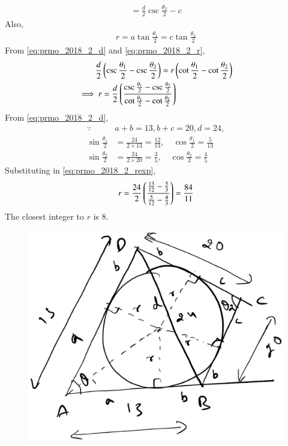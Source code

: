 \documentclass[journal,12pt,twocolumn]{IEEEtran}
\renewcommand\thesection{\arabic{section}}
\begin{document}
\begin{enumerate}[label=\thesection.\arabic*,ref=\thesection.\theenumi]
\begin{align}
= \frac{d}{2} \csc \frac{\theta_2}{2} -c
\label{eq:prmo_2018_2_d}
\end{align}
%
Also,
\begin{align}
\label{eq:prmo_2018_2_r}
r = a\tan \frac{\theta_1}{2} =c\tan \frac{\theta_2}{2}
\end{align}
%
From \eqref{eq:prmo_2018_2_d} and \eqref{eq:prmo_2018_2_r}, 
\begin{align}
\label{eq:prmo_2018_2_rd}
\frac{d}{2} &\brak{\csc \frac{\theta_1}{2}-\csc \frac{\theta_2}{2}} = r\brak{\cot \frac{\theta_1}{2} -\cot \frac{\theta_2}{2}}
\\
\implies r &= \frac{d}{2} \brak{\frac{\csc \frac{\theta_1}{2}-\csc \frac{\theta_2}{2}}{\cot \frac{\theta_1}{2} -\cot \frac{\theta_2}{2}}}
\label{eq:prmo_2018_2_rexp}
\end{align}
From \eqref{eq:prmo_2018_2_d},
\begin{align}
\label{eq:prmo_2018_2_angs}
\because &a+b = 13, b+c = 20, d = 24,
\\
\sin\frac{\theta_1}{2} & = \frac{24}{2\times 13} = \frac{12}{13}, \quad \cos\frac{\theta_1}{2} = \frac{5}{13}
\\
\sin\frac{\theta_2}{2} & = \frac{24}{2\times 20	} = \frac{3}{5}, \quad \cos\frac{\theta_2}{2}=\frac{4}{5}
\end{align}
%
Substituting in \eqref{eq:prmo_2018_2_rexp},
\begin{align}
r = \frac{24}{2} \left(\frac{\frac{13}{12}- \frac{5}{3}}{ \frac{5}{12} - \frac{4}{3}}\right) = \frac{84}{11}
\end{align}
%
The closest integer to $r$ is 8.
\begin{figure}[!ht]
\centering
\includegraphics[width=\columnwidth]{./figs/prmo_2018_2.eps}
\caption{}
\label{fig:prmo_2018_2}
\end{figure}


\end{enumerate}
\end{document}
